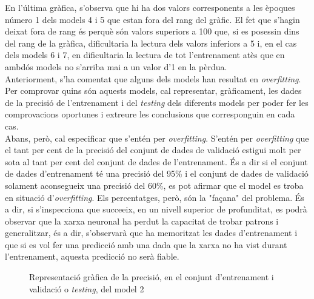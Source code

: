 \documentclass[a4paper,12pt]{report}
\begin{document}
En l'última gràfica, s'observa que hi ha dos valors corresponents a les èpoques número 1 dels models 4 i 5 que estan fora del rang del gràfic. El fet que s'hagin deixat fora de rang és perquè són valors superiors a 100 que, si es posessin dins del rang de la gràfica, dificultaria la lectura dels valors inferiors a 5 i, en el cas dels models 6 i 7, en dificultaria la lectura de tot l'entrenament atès que en ambdós models no s'arriba mai a un valor d'1 en la pèrdua.\\
Anteriorment, s'ha comentat que alguns dels models han resultat en \textit{overfitting}. Per comprovar quins són aquests models, cal representar, gràficament, les dades de la precisió de l'entrenament i del \textit{testing} dels diferents models per poder fer les comprovacions oportunes i extreure les conclusions que corresponguin en cada cas.\\
Abans, però, cal especificar que s'entén per \textit{overfitting}. S'entén per \textit{overfitting} que el tant per cent de la precisió del conjunt de dades de validació estigui molt per sota al tant per cent del conjunt de dades de l'entrenament. És a dir si el conjunt de dades d'entrenament té una precisió del 95\% i el conjunt de dades de validació solament aconsegueix una precisió del 60\%, es pot afirmar que el model es troba en situació d'\textit{overfitting}. Els percentatges, però, són la "façana" del problema. És a dir, si s'inspecciona que succeeix, en un nivell superior de profunditat, es podrà observar que la xarxa neuronal ha perdut la capacitat de trobar patrons i generalitzar, és a dir, s'observarà que ha memoritzat les dades d'entrenament i que si es vol fer una predicció amb una dada que la xarxa no ha vist durant l'entrenament, aquesta predicció no serà fiable.
\begin{figure}[H]
    \centering
    \caption{Representació gràfica de la precisió, en el conjunt d'entrenament i validació o \textit{testing}, del model 2}
    \label{fig:model2}
\end{figure}
\end{document}
